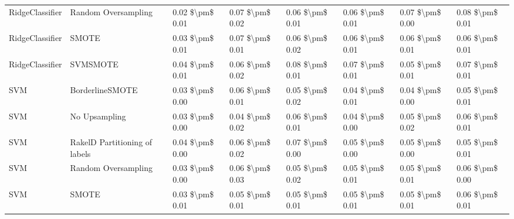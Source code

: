 \begin{tabular}{llllllll}
                RidgeClassifier &           Random Oversampling & 0.02 \$\textbackslash pm\$ 0.01 &           0.07 \$\textbackslash pm\$ 0.02 &       0.06 \$\textbackslash pm\$ 0.01 &        0.06 \$\textbackslash pm\$ 0.01 &                         0.07 \$\textbackslash pm\$ 0.00 &     0.08 \$\textbackslash pm\$ 0.01 \\
                RidgeClassifier &                         SMOTE & 0.03 \$\textbackslash pm\$ 0.01 &           0.07 \$\textbackslash pm\$ 0.01 &       0.06 \$\textbackslash pm\$ 0.02 &        0.06 \$\textbackslash pm\$ 0.01 &                         0.06 \$\textbackslash pm\$ 0.01 &     0.06 \$\textbackslash pm\$ 0.01 \\
                RidgeClassifier &                      SVMSMOTE & 0.04 \$\textbackslash pm\$ 0.01 &           0.06 \$\textbackslash pm\$ 0.02 &       0.08 \$\textbackslash pm\$ 0.01 &        0.07 \$\textbackslash pm\$ 0.01 &                         0.05 \$\textbackslash pm\$ 0.01 &     0.07 \$\textbackslash pm\$ 0.01 \\
                            SVM &               BorderlineSMOTE & 0.03 \$\textbackslash pm\$ 0.00 &           0.06 \$\textbackslash pm\$ 0.01 &       0.05 \$\textbackslash pm\$ 0.02 &        0.04 \$\textbackslash pm\$ 0.01 &                         0.04 \$\textbackslash pm\$ 0.00 &     0.05 \$\textbackslash pm\$ 0.01 \\
                            SVM &                 No Upsampling & 0.03 \$\textbackslash pm\$ 0.00 &           0.04 \$\textbackslash pm\$ 0.02 &       0.06 \$\textbackslash pm\$ 0.01 &        0.04 \$\textbackslash pm\$ 0.00 &                         0.05 \$\textbackslash pm\$ 0.02 &     0.06 \$\textbackslash pm\$ 0.01 \\
                            SVM & RakelD Partitioning of labels & 0.04 \$\textbackslash pm\$ 0.00 &           0.06 \$\textbackslash pm\$ 0.02 &       0.07 \$\textbackslash pm\$ 0.00 &        0.05 \$\textbackslash pm\$ 0.00 &                         0.05 \$\textbackslash pm\$ 0.00 &     0.05 \$\textbackslash pm\$ 0.01 \\
                            SVM &           Random Oversampling & 0.03 \$\textbackslash pm\$ 0.00 &           0.06 \$\textbackslash pm\$ 0.03 &       0.05 \$\textbackslash pm\$ 0.02 &        0.05 \$\textbackslash pm\$ 0.01 &                         0.05 \$\textbackslash pm\$ 0.01 &     0.06 \$\textbackslash pm\$ 0.00 \\
                            SVM &                         SMOTE & 0.03 \$\textbackslash pm\$ 0.01 &           0.05 \$\textbackslash pm\$ 0.01 &       0.05 \$\textbackslash pm\$ 0.01 &        0.05 \$\textbackslash pm\$ 0.01 &                         0.05 \$\textbackslash pm\$ 0.01 &     0.06 \$\textbackslash pm\$ 0.01 \\

\end{tabular}
